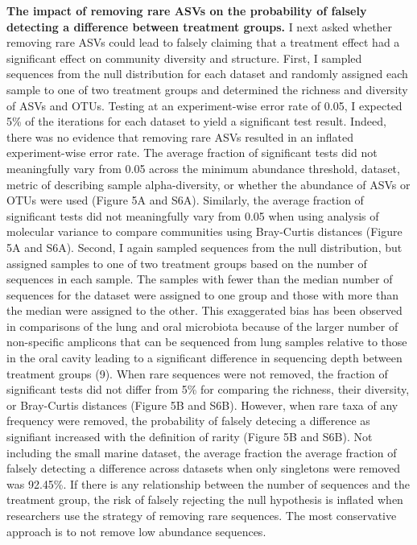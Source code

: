 \documentclass[
]{article}
\begin{document}
\textbf{The impact of removing rare ASVs on the probability of falsely
detecting a difference between treatment groups.} I next asked whether
removing rare ASVs could lead to falsely claiming that a treatment
effect had a significant effect on community diversity and structure.
First, I sampled sequences from the null distribution for each dataset
and randomly assigned each sample to one of two treatment groups and
determined the richness and diversity of ASVs and OTUs. Testing at an
experiment-wise error rate of 0.05, I expected 5\% of the iterations for
each dataset to yield a significant test result. Indeed, there was no
evidence that removing rare ASVs resulted in an inflated experiment-wise
error rate. The average fraction of significant tests did not
meaningfully vary from 0.05 across the minimum abundance threshold,
dataset, metric of describing sample alpha-diversity, or whether the
abundance of ASVs or OTUs were used (Figure 5A and S6A). Similarly, the
average fraction of significant tests did not meaningfully vary from
0.05 when using analysis of molecular variance to compare communities
using Bray-Curtis distances (Figure 5A and S6A). Second, I again sampled
sequences from the null distribution, but assigned samples to one of two
treatment groups based on the number of sequences in each sample. The
samples with fewer than the median number of sequences for the dataset
were assigned to one group and those with more than the median were
assigned to the other. This exaggerated bias has been observed in
comparisons of the lung and oral microbiota because of the larger number
of non-specific amplicons that can be sequenced from lung samples
relative to those in the oral cavity leading to a significant difference
in sequencing depth between treatment groups (9). When rare sequences
were not removed, the fraction of significant tests did not differ from
5\% for comparing the richness, their diversity, or Bray-Curtis
distances (Figure 5B and S6B). However, when rare taxa of any frequency
were removed, the probability of falsely detecing a difference as
signifiant increased with the definition of rarity (Figure 5B and S6B).
Not including the small marine dataset, the average fraction the average
fraction of falsely detecting a difference across datasets when only
singletons were removed was 92.45\%. If there is any relationship
between the number of sequences and the treatment group, the risk of
falsely rejecting the null hypothesis is inflated when researchers use
the strategy of removing rare sequences. The most conservative approach
is to not remove low abundance sequences.
\end{document}
